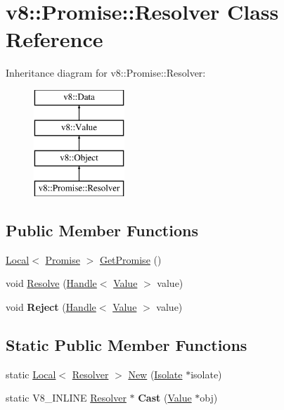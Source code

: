 \hypertarget{classv8_1_1_promise_1_1_resolver}{}\section{v8\+:\+:Promise\+:\+:Resolver Class Reference}
\label{classv8_1_1_promise_1_1_resolver}
Inheritance diagram for v8\+:\+:Promise\+:\+:Resolver\+:\begin{figure}[H]
\begin{center}
\leavevmode
\includegraphics[height=4.000000cm]{classv8_1_1_promise_1_1_resolver}
\end{center}
\end{figure}
\subsection*{Public Member Functions}
\begin{DoxyCompactItemize}
\item 
\hyperlink{classv8_1_1_local}{Local}$<$ \hyperlink{classv8_1_1_promise}{Promise} $>$ \hyperlink{classv8_1_1_promise_1_1_resolver_a41fd1ffef546a62e363a639935fc8ae3}{Get\+Promise} ()
\item 
void \hyperlink{classv8_1_1_promise_1_1_resolver_aa1f7f6883d57879a7956e84e63b2d935}{Resolve} (\hyperlink{classv8_1_1_handle}{Handle}$<$ \hyperlink{classv8_1_1_value}{Value} $>$ value)
\item 
\hypertarget{classv8_1_1_promise_1_1_resolver_a12b1f6ef41dd7d759443631135502847}{}void {\bfseries Reject} (\hyperlink{classv8_1_1_handle}{Handle}$<$ \hyperlink{classv8_1_1_value}{Value} $>$ value)\label{classv8_1_1_promise_1_1_resolver_a12b1f6ef41dd7d759443631135502847}

\end{DoxyCompactItemize}
\subsection*{Static Public Member Functions}
\begin{DoxyCompactItemize}
\item 
static \hyperlink{classv8_1_1_local}{Local}$<$ \hyperlink{classv8_1_1_promise_1_1_resolver}{Resolver} $>$ \hyperlink{classv8_1_1_promise_1_1_resolver_a80b9e402b6b49f41d57d404ed9e00c9d}{New} (\hyperlink{classv8_1_1_isolate}{Isolate} $\ast$isolate)
\item 
\hypertarget{classv8_1_1_promise_1_1_resolver_ab2b541cb210158ed0c757c8b7dc46279}{}static V8\+\_\+\+I\+N\+L\+I\+N\+E \hyperlink{classv8_1_1_promise_1_1_resolver}{Resolver} $\ast$ {\bfseries Cast} (\hyperlink{classv8_1_1_value}{Value} $\ast$obj)\label{classv8_1_1_promise_1_1_resolver_ab2b541cb210158ed0c757c8b7dc46279}

\end{DoxyCompactItemize}
